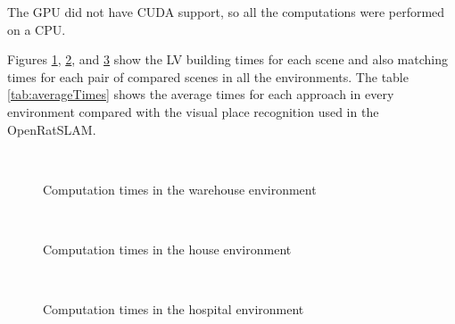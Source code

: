 The GPU did not have CUDA support, so all the computations were performed on a CPU.\par
Figures \ref{fig:timesWarehouse}, \ref{fig:timesHouse}, and \ref{fig:timesHospital} show the LV building times for each scene and also matching times for each pair of compared scenes in all the environments. The table \ref{tab:averageTimes} shows the average times for each approach in every environment compared with the visual place recognition used in the OpenRatSLAM.


\begin{figure}[!tbp]
    \centering
    \\
    \caption{Computation times in the warehouse environment}
    \label{fig:timesWarehouse}
\end{figure}

\begin{figure}[!tbp]
    \centering
    \\
    \caption{Computation times in the house environment}
    \label{fig:timesHouse}
\end{figure}

\begin{figure}[!tbp]
    \centering
    \\
    \caption{Computation times in the hospital environment}
    \label{fig:timesHospital}
\end{figure}

